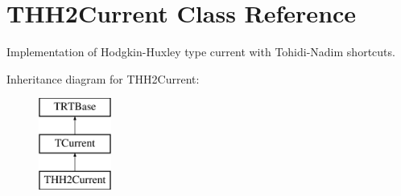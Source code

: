 \hypertarget{class_t_h_h2_current}{\section{T\+H\+H2\+Current Class Reference}
\label{class_t_h_h2_current}
}


Implementation of Hodgkin-\/\+Huxley type current with Tohidi-\/\+Nadim shortcuts.  


Inheritance diagram for T\+H\+H2\+Current\+:\begin{figure}[H]
\begin{center}
\leavevmode
\includegraphics[height=3.000000cm]{class_t_h_h2_current}
\end{center}
\end{figure}

